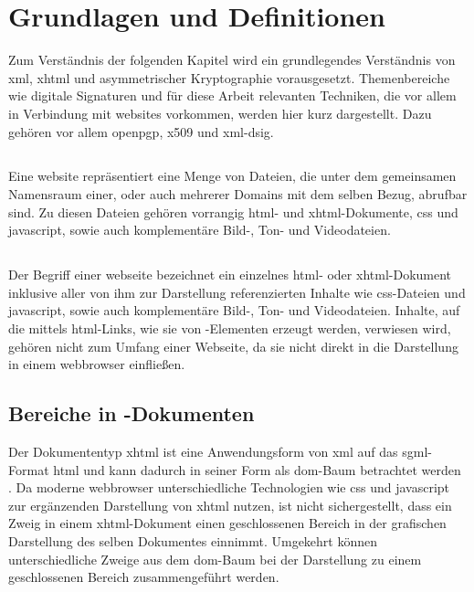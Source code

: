 
\chapter{Grundlagen und Definitionen}
\label{chap:GrundlagenDefinitionen}

Zum Verständnis der folgenden Kapitel wird ein grundlegendes Verständnis von \gls{xml}, \gls{xhtml} und asymmetrischer Kryptographie vorausgesetzt.
Themenbereiche wie digitale Signaturen und für diese Arbeit relevanten Techniken, die vor allem in Verbindung mit \glspl{website} vorkommen, werden hier kurz
dargestellt. Dazu gehören vor allem \gls{openpgp}, \gls{x509} und \gls{xml-dsig}.

\section{}
\label{sec:GrundlagenDefinitionen:Website}
Eine \gls{website} repräsentiert eine Menge von Dateien, die unter dem gemeinsamen Namensraum einer, oder auch mehrerer Domains mit dem selben Bezug, abrufbar
sind. Zu diesen Dateien gehören vorrangig \gls{html}- und \gls{xhtml}-Dokumente, \gls{css} und \gls{javascript}, sowie auch komplementäre Bild-, Ton- und
Videodateien.

\section{}
\label{sec:GrundlagenDefinitionen:Webseiten}
Der Begriff einer \gls{webseite} bezeichnet ein einzelnes \gls{html}- oder \gls{xhtml}-Dokument inklusive aller von ihm zur Darstellung referenzierten
Inhalte wie \gls{css}-Dateien und \gls{javascript}, sowie auch komplementäre Bild-, Ton- und Videodateien. Inhalte, auf die mittels \gls{html}-Links, wie sie
von -Elementen erzeugt werden, verwiesen wird, gehören nicht zum Umfang einer Webseite, da sie nicht direkt in die Darstellung in einem
\gls{webbrowser} einfließen.

\section{Bereiche in -Dokumenten}
\label{sec:GrundlagenDefinitionen:BereicheXHTML}
Der Dokumententyp \gls{xhtml} ist eine Anwendungsform von \gls{xml} auf das \gls{sgml}-Format \gls{html}\cite{xhtml:w3c} und kann dadurch in seiner Form als
\gls{dom}-Baum betrachtet werden \cite{xhtml:oreilly}. Da moderne \Gls{webbrowser} unterschiedliche Technologien wie \gls{css} und \gls{javascript} zur
ergänzenden Darstellung von \gls{xhtml} nutzen, ist nicht sichergestellt, dass ein Zweig in einem \gls{xhtml}-Dokument einen geschlossenen Bereich in der
grafischen Darstellung des selben Dokumentes einnimmt. Umgekehrt können unterschiedliche Zweige aus dem \gls{dom}-Baum bei der Darstellung zu einem
geschlossenen Bereich zusammengeführt werden.

